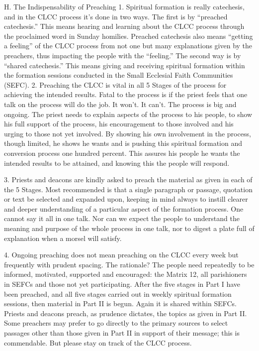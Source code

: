 \documentclass[oneside]{book}
\begin{document}
H. The Indispensability of Preaching
1. Spiritual formation is really catechesis, and in the CLCC process it's done
in two ways. The first is by ``preached catechesis.'' This means hearing and
learning about the CLCC process through the proclaimed word in Sunday
homilies. Preached catechesis also means ``getting a feeling'' of the CLCC
process from not one but many explanations given by the preachers, thus
impacting the people with the ``feeling.'' The second way is by ``shared
catechesis.'' This means giving and receiving spiritual formation within the
formation sessions conducted in the Small Ecclesial Faith Communities (SEFC).
2. Preaching the CLCC is vital in all 5 Stages of the process for achieving the
intended results. Fatal to the process is if the priest feels that one talk on
the process will do the job. It won't. It can't. The process is big and
ongoing. The priest needs to explain aspects of the process to his people, to
show his full support of the process, his encouragement to those involved and
his urging to those not yet involved. By showing his own involvement in the
process, though limited, he shows he wants and is pushing this spiritual
formation and conversion process one hundred percent. This assures his people he
wants the intended results to be attained, and knowing this the people will
respond.

3. Priests and deacons are kindly asked to preach the material as given in each
of the 5 Stages. Most recommended is that a single paragraph or passage,
quotation or text be selected and expanded upon, keeping in mind always to
instill clearer and deeper understanding of a particular aspect of the formation
process. One cannot say it all in one talk. Nor can we expect the people to
understand the meaning and purpose of the whole process in one talk, nor to
digest a plate full of explanation when a morsel will satisfy.

4. Ongoing preaching does not mean preaching on the CLCC every week but
frequently with prudent spacing. The rationale? The people need repeatedly to be
informed, motivated, supported and encouraged: the Matrix 12, all parishioners
in SEFCs and those not yet participating. After the five stages in Part I have
been preached, and all five stages carried out in weekly spiritual formation
sessions, then material in Part II is begun. Again it is shared within
SEFCs. Priests and deacons preach, as prudence dictates, the topics as given in
Part II. Some preachers may prefer to go directly to the primary sources to
select passages other than those given in Part II in support of their message;
this is commendable. But please stay on track of the CLCC process.
\end{document}
